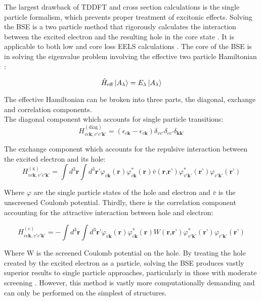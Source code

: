 The largest drawback of TDDFT and cross section calculations is the single particle formalism, which prevents proper treatment of excitonic effects. Solving the BSE is a two particle method that rigorously calculates the  interaction between the excited electron and the resulting hole in the core state \cite{salpeter_relativistic_1951}.  It is applicable to both low and core loss EELS calculations \cite{exciting}.  The core of the BSE is in solving the eigenvalue problem involving the effective two particle Hamiltonian \cite{draxl_bse_2009}: 


\begin{equation}
\hat{H}_{\mathrm{eff}} \ket{A_\lambda} = E_\lambda \ket{A_\lambda}
\end{equation}


The effective Hamiltonian can be broken into three parts, the diagonal, exchange and correlation components\cite{draxl_bse_2009}. \\
The diagonal component which accounts for single particle transitions:
\begin{equation}
	H_{v c \textbf{k}, v' c'\textbf{k'}}^{(\mathrm{diag})} = (\epsilon_{c\textbf{k}}-\epsilon_{v \textbf{k}})\delta_{vv'}\delta_{cc'}\delta_{\textbf{kk'}}
\end{equation}

The exchange component which accounts for the repulsive interaction between the excited electron and its hole: 
\begin{equation}
	H_{v c \textbf{k}, v' c'\textbf{k'}}^{(\mathrm{x})} = \int d^3\textbf{r}\int d^3\textbf{r'}\varphi_{v\textbf{k}}(\textbf{r})\varphi_{c\textbf{k}}^*(\textbf{r})\bar{v}(\textbf{r,r'})\varphi_{v'\textbf{k'}}^*(\textbf{r'})\varphi_{c'\textbf{k'}}(\textbf{r'})
\end{equation}

Where $\varphi$ are the single particle states of the hole and electron and $\bar{v}$ is the unscreened Coulomb potential.  Thirdly, there is the correlation component accounting for the attractive interaction between hole and electron:

\begin{equation}
	H_{v c \textbf{k}, v' c'\textbf{k'}}^{(\mathrm{c})} = -\int d^3\textbf{r}\int d^3\textbf{r'}\varphi_{v\textbf{k}}(\textbf{r})\varphi_{c\textbf{k}}^*(\textbf{r})W(\textbf{r,r'})\varphi_{v'\textbf{k'}}^*(\textbf{r'})\varphi_{c'\textbf{k'}}(\textbf{r'})
\end{equation}

Where W is the screened Coulomb potential on the hole. By treating the hole created by the excited electron as a particle, solving the BSE produces vastly superior results to single particle approaches, particularly in those with moderate screening \cite{draxl_bse_2009}.  However, this method is vastly more computationally demanding and can only be performed on the simplest of structures.   


